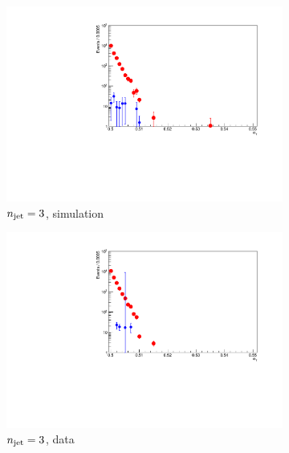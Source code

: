 \begin{figure}[h!]
  \centering
  \begin{subfigure}[b]{0.46\textwidth}
    \includegraphics[width=\textwidth]{Figs/dphi/chris2/qcd_mc/dphi_incl/dphi_eq3j_ge0b_775}
    \caption{$n_{\text{jet}} = 3$, simulation}
    \label{fig:dphi_acceptance_sim_3j}
  \end{subfigure}
  \begin{subfigure}[b]{0.46\textwidth}
    \includegraphics[width=\textwidth]{Figs/dphi/chris2/data/dphi_incl/dphi_eq3j_ge0b_775}
    \caption{$n_{\text{jet}} = 3$, data}
    \label{fig:dphi_acceptance_data_3j}
  \end{subfigure}\\
  \begin{subfigure}[b]{0.46\textwidth}

\end{subfigure}
\end{figure}

